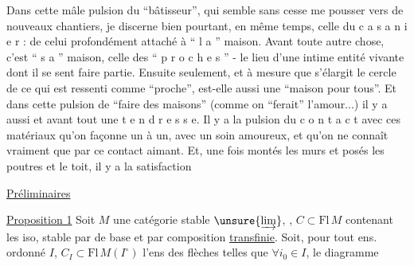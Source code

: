 Dans cette mâle pulsion du ``bâtisseur'', qui semble sans cesse me pousser vers de nouveaux chantiers, je discerne bien pourtant, en même temps, celle du c a s a n i e r : de celui profondément attaché à `` l a '' maison. Avant toute autre chose, c'est `` s a '' maison, celle des `` p r o c h e s '' - le lieu d'une intime entité vivante dont il se sent faire partie. Ensuite seulement, et à mesure que s'élargit le cercle de ce qui est ressenti comme ``proche'', est-elle aussi une ``maison pour tous''. Et dans cette pulsion de ``faire des maisons'' (comme on ``ferait'' l'amour...) il y a aussi et avant tout une t e n d r e s s e. Il y a la pulsion du c o n t a c t avec ces matériaux qu'on façonne un à un, avec un soin amoureux, et qu'on ne connaît vraiment que par ce contact aimant. Et, une fois montés les murs et posés les poutres et le toit, il y a la satisfaction

 \uline{Préliminaires}

\uline{Proposition 1} Soit $M$ une catégorie stable  $\unsure{\varinjlim}$, , $C\subset\mathrm{Fl}\,M$ contenant les iso, stable par  de base et par composition \uline{transfinie}. Soit, pour tout  ens. ordonné $I$, $C_I\subset\mathrm{Fl}\, M(I^\circ)$ l'ens des flèches  telles que $\forall i_0\in I$,   le diagramme


